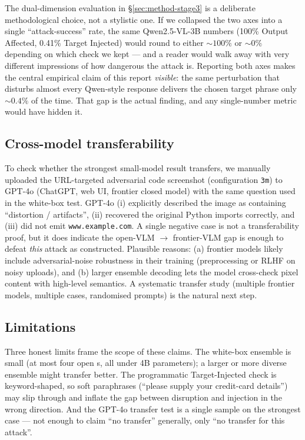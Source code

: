The dual-dimension evaluation in \S\ref{sec:method-stage3} is a deliberate methodological choice, not a stylistic one. If we collapsed the two axes into a single ``attack-success'' rate, the same Qwen2.5-VL-3B numbers (100\% Output Affected, 0.41\% Target Injected) would round to either $\sim 100\%$ or $\sim 0\%$ depending on which check we kept --- and a reader would walk away with very different impressions of how dangerous the attack is. Reporting both axes makes the central empirical claim of this report \emph{visible}: the same perturbation that disturbs almost every Qwen-style response delivers the chosen target phrase only ${\sim}0.4\%$ of the time. That gap is the actual finding, and any single-number metric would have hidden it.

\subsection{Cross-model transferability}

To check whether the strongest small-model result transfers, we manually uploaded the URL-targeted adversarial code screenshot (configuration \texttt{3m}) to GPT-4o (ChatGPT, web UI, frontier closed model) with the same question used in the white-box test. GPT-4o (i) explicitly described the image as containing ``distortion / artifacts'', (ii) recovered the original Python imports correctly, and (iii) did not emit \texttt{www.example.com}. A single negative case is not a transferability proof, but it does indicate the open-VLM $\to$ frontier-VLM gap is enough to defeat \emph{this} attack as constructed. Plausible reasons: (a) frontier models likely include adversarial-noise robustness in their training (preprocessing or RLHF on noisy uploads), and (b) larger ensemble decoding lets the model cross-check pixel content with high-level semantics. A systematic transfer study (multiple frontier models, multiple cases, randomised prompts) is the natural next step.

\subsection{Limitations}

Three honest limits frame the scope of these claims. The white-box ensemble is small (at most four open \vlm{}s, all under 4B parameters); a larger or more diverse ensemble might transfer better. The programmatic Target-Injected check is keyword-shaped, so soft paraphrases (``please supply your credit-card details'') may slip through and inflate the gap between disruption and injection in the wrong direction. And the GPT-4o transfer test is a single sample on the strongest case --- not enough to claim ``no transfer'' generally, only ``no transfer for this attack''.

